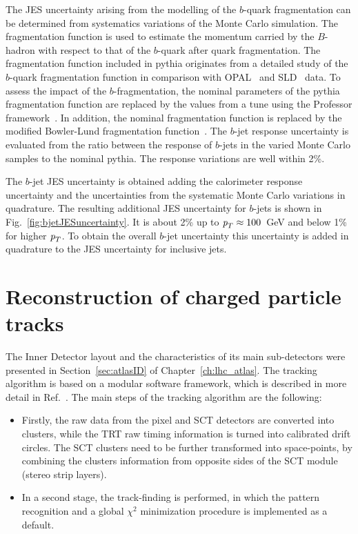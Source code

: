 \begin{itemize}
The JES uncertainty arising from the modelling of the $b$-quark fragmentation can be determined from systematics variations of the Monte Carlo simulation. The fragmentation function is used to estimate the momentum carried by the $B$-hadron with respect to that of the $b$-quark after quark fragmentation.   The fragmentation function included in {\sc pythia} originates from a detailed study of the $b$-quark fragmentation function in comparison with OPAL~\cite{Abbiendi:2002vt} and SLD~\cite{Abe:2002iq} data. To assess the impact of the $b$-fragmentation, the nominal parameters of the {\sc pythia} fragmentation function are replaced by the values from a tune using the Professor framework~\cite{Professor}. In addition, the nominal fragmentation function is replaced by the modified Bowler-Lund fragmentation function~\cite{BowlerLund}. The $b$-jet response uncertainty is evaluated from the ratio between the response of $b$-jets in the varied Monte Carlo samples to the nominal {\sc pythia}. The response variations are well within 2\%.

The $b$-jet JES uncertainty is obtained adding the calorimeter response uncertainty and the uncertainties from the systematic Monte Carlo variations in quadrature. The resulting additional JES uncertainty for $b$-jets is shown in Fig.~\ref{fig:bjetJESuncertainty}. It is about 2\% up to ${\emph{p}_{T}} \approx 100$~GeV and below 1\% for higher ${\emph{p}_{T}}$. To obtain the overall $b$-jet uncertainty this uncertainty is added in quadrature to the JES uncertainty for inclusive jets.


\section{Reconstruction of charged particle tracks}\label{sec:trackreco}

The Inner Detector layout and the characteristics of its main sub-detectors were presented in Section~\ref{sec:atlasID} of Chapter~\ref{ch:lhc_atlas}. The tracking algorithm is based on a modular software framework, which is described in more detail in Ref.~\cite{Cornelissen:1020106}. The main steps of the tracking algorithm are the following:

\begin{itemize}
\item
Firstly, the raw data from the pixel and SCT detectors are converted into clusters, while the TRT raw timing information is turned into calibrated drift circles. The SCT clusters need to be further transformed into space-points, by combining the clusters information from opposite sides of the SCT module (stereo strip layers).
\item
In a second stage, the track-finding is performed, in which the pattern recognition and a global $\chi^2$ minimization procedure is implemented as a default.
\end{itemize}


\end{itemize}
